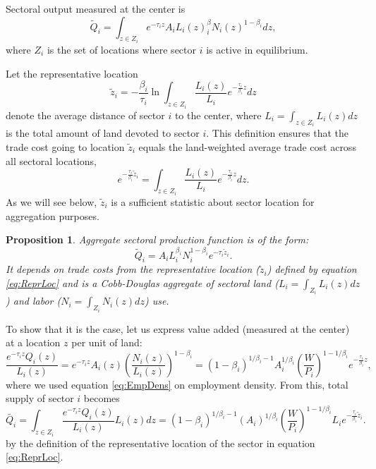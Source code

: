 \documentclass[12pt]{article}
\newtheorem{proposition}{Proposition}
\begin{document}
Sectoral output measured at the center is
\begin{equation*}
\tilde{Q}_i=\int_{z\in Z_i}e^{-\tau_i z}A_iL_i(z)^\beta_iN_i(z)^{1-\beta_i}dz,
\end{equation*}
where $Z_i$ is the set of locations where sector $i$ is active in equilibrium. 

Let the representative location
\begin{equation}
\label{eq:ReprLoc}
\tilde z_i = -
\frac{\beta_i}{\tau_i}
\ln\int_{z\in Z_i} \frac{L_i(z)}{L_i}e^{-\frac{\tau_i}{\beta_i} z}dz
\end{equation}
denote the average distance of sector $i$ to the center, where $L_i=\int_{z\in Z_i} L_i(z)dz$ is the total amount of land devoted to sector $i$. This definition ensures that the trade cost going to location $\tilde z_i$ equals the land-weighted average trade cost across all sectoral locations,
\[
e^{-\frac{\tau_i}{\beta_i} \tilde z_i} = \int_{z\in Z_i} \frac{L_i(z)}{L_i}e^{-\frac{\tau_i}{\beta_i} z}dz.
\]
As we will see below, $\tilde z_i$ is a sufficient statistic about sector location for aggregation purposes. %

\begin{proposition}
Aggregate sectoral production function is of the form: 
\begin{equation}
\tilde Q_i =
A_iL_i^{\beta_i}N_i^{1-\beta_i}
 e^{-\tau_i\tilde z_i}.
\end{equation}
It depends on trade costs from the representative location ($\tilde{z}_i$) defined by equation \ref{eq:ReprLoc} and is a Cobb-Douglas aggregate of sectoral land ($L_i=\int_{Z_i}L_i(z)dz$) and labor ($N_i=\int_{Z_i}N_i(z)dz$) use.
\end{proposition}

To show that it is the case, let us express value added (measured at the center) at a location $z$ per unit of land:
\[
\frac{e^{-\tau_i z} Q_i(z)}{L_i(z)} = e^{-\tau_i z} A_i(z)\left(\frac{N_i(z)}{L_i(z)}\right)^{1-\beta_i} = (1-\beta_i)^{1/\beta_i-1}
A_i^{1/\beta_i}\left(\frac{W}{P_i}\right)^{1-1/\beta_i}
 e^{-\frac{\tau_i}{\beta_i} z},
\]
where we used equation \ref{eq:EmpDens} on employment density. From this, total supply of sector $i$ becomes 
\begin{equation}
\label{eq:OutputInterm}
\tilde{Q_i} = \int_{z\in Z_i}\frac{e^{-\tau_i z} Q_i(z)}{L_i(z)}L_i(z)dz=(1-\beta_i)^{1/\beta_i-1}
(A_i)^{1/\beta_i}\left(\frac{W}{P_i}\right)^{1-1/\beta_i} L_i e^{-\frac{\tau_i}{\beta_i} \tilde z_i}.
\end{equation} 
by the definition of the representative location of the sector in equation \ref{eq:ReprLoc}.
\end{document}
